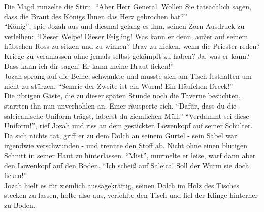 Die Magd runzelte die Stirn. ``Aber Herr General. Wollen Sie tatsächlich sagen, dass die Braut des 
Königs Ihnen das Herz gebrochen hat?''\\
``König'', spie Jozah aus und diesmal gelang es ihm, seinen Zorn Ausdruck zu verleihen: ``Dieser 
Welpe! Dieser Feigling! Was kann er denn, außer auf seinem hübschen Ross zu sitzen und zu winken? 
Brav zu nicken, wenn die Priester reden? Kriege zu veranlassen ohne jemals selbst gekämpft zu 
haben? Ja, was er kann? Dass kann ich dir sagen! Er kann meine Braut ficken!''\\
Jozah sprang auf die Beine, schwankte und musste sich am Tisch festhalten um nicht zu stürzen. 
``Semric der Zweite ist ein Wurm! Ein Häufchen Dreck!''\\
Die übrigen Gäste, die zu dieser späten Stunde noch die Taverne besuchten, starrten ihn nun 
unverhohlen an. Einer räusperte sich. ``Dafür, dass du die saleicanische Uniform trägst, laberst du 
ziemlichen Müll.''
``Verdammt sei diese Uniform!'', rief Jozah und riss an dem gestickten Löwenkopf auf seiner 
Schulter. Da sich nichts tat, griff er zu dem Dolch an seinem Gürtel - sein Säbel war irgendwie 
verschwunden - und trennte den Stoff ab. Nicht ohne einen blutigen Schnitt in seiner Haut zu 
hinterlassen. ``Mist'', murmelte er leise, warf dann aber den Löwenkopf auf den Boden. ``Ich scheiß 
auf Saleica! Soll der Wurm sie doch ficken!''\\
Jozah hielt es für ziemlich aussagekräftig, seinen Dolch im Holz des Tisches stecken zu lassen, 
holte also aus, verfehlte den Tisch und fiel der Klinge hinterher zu Boden.\\

